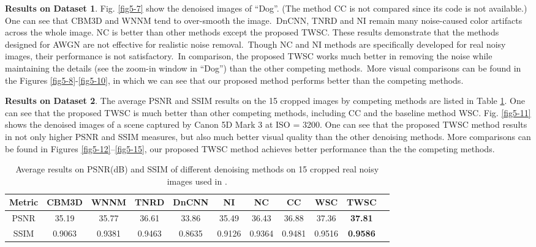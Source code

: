 \textbf{Results on Dataset 1}. Fig. \ref{fig5-7} show the denoised images of ``Dog''. (The method CC \cite{crosschannel2016} is not compared since its code is not available.) One can see that CBM3D and WNNM tend to over-smooth the image.\ DnCNN, TNRD and NI remain many noise-caused color artifacts across the whole image. NC is better than other methods except the proposed TWSC. These results demonstrate that the methods designed for AWGN are not effective for realistic noise removal.\ Though NC and NI methods are specifically developed for real noisy images, their performance is not satisfactory.\ In comparison, the proposed TWSC works much better in removing the noise while maintaining the details (see the zoom-in window in ``Dog'') than the other competing methods.\ More visual comparisons can be found in the Figures \ref{fig5-8}-\ref{fig5-10}, in which we can see that our proposed method performs better than the competing methods.

\textbf{Results on Dataset 2}. The average PSNR and SSIM results on the 15 cropped images by competing methods are listed in Table \ref{tab5-2}. One can see that the proposed TWSC is much better than other competing methods, including CC and the baseline method WSC. Fig. \ref{fig5-11} shows the denoised images of a scene captured by Canon 5D Mark 3 at ISO = 3200. One can see that the proposed TWSC method results in not only higher PSNR and SSIM measures, but also much better visual quality than the other denoising methods. More comparisons can be found in Figures \ref{fig5-12}--\ref{fig5-15}, our proposed TWSC method achieves better performance than the the competing methods.


\begin{table}[t!]
\caption{Average results on PSNR(dB) and SSIM of different denoising methods on 15 cropped real noisy images used in \cite{crosschannel2016}.}
\label{tab5-2}
\begin{center}
\renewcommand\arraystretch{1}
\footnotesize
\begin{tabular*}{1\textwidth}{@{\extracolsep{\fill}}ccccccccccc}
\hline
Metric
&
\textbf{CBM3D}
&
\textbf{WNNM}
&
\textbf{TNRD}
&
\textbf{DnCNN}
&
\textbf{NI}
&
\textbf{NC}
&
\textbf{CC}
&
\textbf{WSC}
&
\textbf{TWSC}
\\
\hline
PSNR & 35.19 & 35.77 & 36.61 & 33.86 & 35.49 & 36.43  & 36.88 & 37.36 & \textbf{37.81}
\\
\hline
SSIM & 0.9063 & 0.9381 & 0.9463 & 0.8635 & 0.9126 & 0.9364 & 0.9481 & 0.9516 & \textbf{0.9586}
\\
\hline
\end{tabular*}
\end{center}
\end{table}

